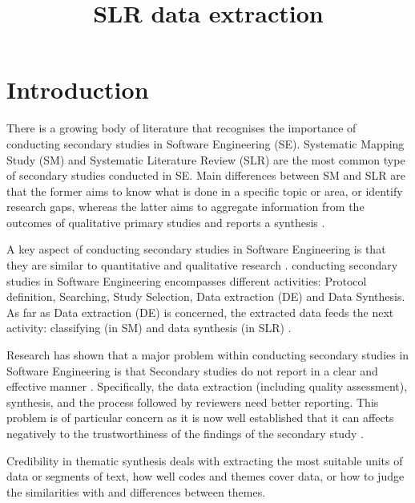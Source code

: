 \documentclass{article}
\title{SLR data extraction}
\author{}
\newcommand{\todo}[1] {\iffalse #1 \fi} %
\begin{document}
\maketitle
      

\section{Introduction}

There is a growing body of literature that recognises the importance of conducting secondary studies in Software Engineering (SE). Systematic Mapping Study (SM) and Systematic Literature Review (SLR) are the most common type of secondary studies conducted in SE. Main differences between SM and SLR are that the former aims to know what is done in a specific topic or area, or identify research gaps, whereas the latter aims to aggregate information from the outcomes of qualitative primary studies \cite{Kitchenham2015} and reports a synthesis \cite{Wohlin2013}.

A key aspect of conducting secondary studies in Software Engineering is that they are similar to quantitative and qualitative research \cite{Wohlin2013}.  
conducting secondary studies in Software Engineering encompasses different activities: Protocol definition, Searching, Study Selection, Data extraction (DE) and Data Synthesis. As far as Data extraction (DE) is concerned, the extracted data feeds the next activity: classifying (in SM) and data synthesis (in SLR) \cite{Garousi2017}. 

\todo{What are the claims of SLR studies?}
\todo{What are the benefits of SLR studies?}

    
    
Research has shown that a major problem within conducting secondary studies in Software Engineering is that Secondary studies do not report in a clear and effective manner \cite{Budgen2018}. Specifically, the data extraction (including quality assessment), synthesis, and the process followed by reviewers need better reporting. This problem is of particular concern as it is now well established that it can affects negatively to the trustworthiness of the findings of the secondary study \cite{Cruzes2011}.  

Credibility in thematic synthesis deals with extracting the most suitable units of data or segments of text, how well codes and themes cover data, or how to judge the similarities with and differences between themes.
\end{document}
